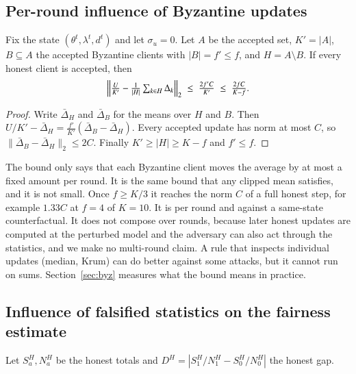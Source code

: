 \subsection{Per-round influence of Byzantine updates}

\begin{theorem}\label{thm:update}
Fix the state $(\theta^t,\lambda^t,d^t)$ and let $\sigma_u=0$. Let $A$ be the accepted set, $K'=|A|$, $B\subseteq A$ the accepted Byzantine clients with $|B|=f'\le f$, and $H=A\setminus B$. If every honest client is accepted, then
\begin{equation}
\Bigl\|\tfrac{U}{K'}-\tfrac{1}{|H|}\textstyle\sum_{k\in H}\Delta_k\Bigr\|_2\;\le\;\frac{2f'C}{K'}\;\le\;\frac{2fC}{K-f}.
\end{equation}
\end{theorem}

\begin{proof}
Write $\bar\Delta_H$ and $\bar\Delta_B$ for the means over $H$ and $B$. Then $U/K'-\bar\Delta_H=\frac{f'}{K'}(\bar\Delta_B-\bar\Delta_H)$. Every accepted update has norm at most $C$, so $\|\bar\Delta_B-\bar\Delta_H\|_2\le2C$. Finally $K'\ge|H|\ge K-f$ and $f'\le f$.
\end{proof}

The bound only says that each Byzantine client moves the average by at most a fixed amount per round. It is the same bound that any clipped mean satisfies, and it is not small. Once $f\ge K/3$ it reaches the norm $C$ of a full honest step, for example $1.33C$ at $f=4$ of $K=10$. It is per round and against a same-state counterfactual. It does not compose over rounds, because later honest updates are computed at the perturbed model and the adversary can also act through the statistics, and we make no multi-round claim. A rule that inspects individual updates (median, Krum) can do better against some attacks, but it cannot run on sums. Section~\ref{sec:byz} measures what the bound means in practice.

\subsection{Influence of falsified statistics on the fairness estimate}

Let $S^H_a,N^H_a$ be the honest totals and $D^H=|S^H_1/N^H_1-S^H_0/N^H_0|$ the honest gap.

